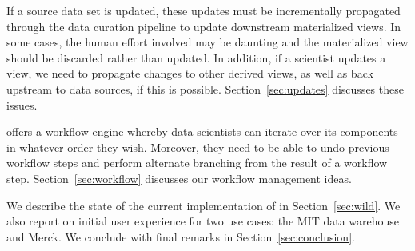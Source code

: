 
\stitle{[Updates.]}  If a source data set is updated, these updates must be
incrementally propagated through the data curation pipeline to update downstream
materialized views.  In some cases, the human effort involved may be daunting
and the materialized view should be discarded rather than updated.  In addition,
if a scientist updates a view, we need to propagate changes to other derived
views, as well as back upstream to data sources, if this is possible.
Section~\ref{sec:updates} discusses these  issues.


\stitle{[Workflow.]} \dcv offers a workflow engine whereby data scientists can
iterate over its components in whatever order they wish. Moreover, they
need to be able to undo previous workflow steps and perform alternate branching
from the result of a workflow step.  Section~\ref{sec:workflow} discusses our
workflow management ideas.

\smallskip

We describe the state of the current implementation of \dcv in
Section~\ref{sec:wild}. We also report on initial user experience for two use
cases: the MIT data warehouse and Merck. We conclude with final remarks in Section~\ref{sec:conclusion}.

